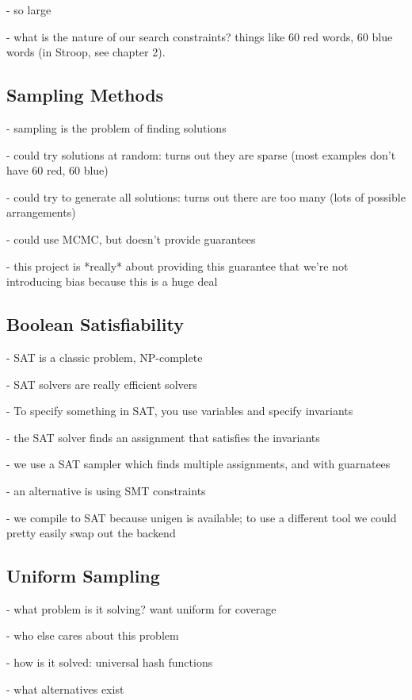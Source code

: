 - so large

- what is the nature of our search constraints? things like 60 red words, 60 blue words (in Stroop, see chapter 2).


\subsection{Sampling Methods}

- sampling is the problem of finding solutions

- could try solutions at random: turns out they are sparse (most examples don't have 60 red, 60 blue)

- could try to generate all solutions: turns out there are too many (lots of possible arrangements)

- could use MCMC, but doesn't provide guarantees

- this project is *really* about providing this guarantee that we're not introducing bias because this is a huge deal

\subsection{Boolean Satisfiability}

- SAT is a classic problem, NP-complete

- SAT solvers are really efficient solvers

- To specify something in SAT, you use variables and specify invariants

- the SAT solver finds an assignment that satisfies the invariants

- we use a SAT sampler which finds multiple assignments, and with guarnatees

- an alternative is using SMT constraints

- we compile to SAT because unigen is available; to use a different tool we could pretty easily swap out the backend


\subsection{Uniform Sampling}

\cite{meel2016constrained}

- what problem is it solving? want uniform for coverage

- who else cares about this problem

- how is it solved: universal hash functions

- what alternatives exist
